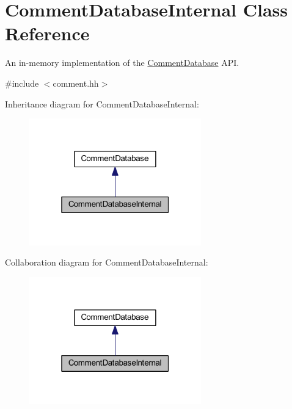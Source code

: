 \hypertarget{class_comment_database_internal}{}\section{Comment\+Database\+Internal Class Reference}
\label{class_comment_database_internal}


An in-\/memory implementation of the \mbox{\hyperlink{class_comment_database}{Comment\+Database}} A\+PI.  




{\ttfamily \#include $<$comment.\+hh$>$}



Inheritance diagram for Comment\+Database\+Internal\+:
\nopagebreak
\begin{figure}[H]
\begin{center}
\leavevmode
\includegraphics[width=211pt]{class_comment_database_internal__inherit__graph}
\end{center}
\end{figure}


Collaboration diagram for Comment\+Database\+Internal\+:
\nopagebreak
\begin{figure}[H]
\begin{center}
\leavevmode
\includegraphics[width=211pt]{class_comment_database_internal__coll__graph}
\end{center}
\end{figure}
